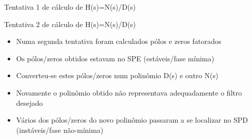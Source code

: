 \begin{frame}{Tentativa 1 de cálculo de H(s)=N(s)/D(s)}
        \begin{figure}[!htb]
        \centering
    \end{figure}
\end{frame}

\begin{frame}{Tentativa 2 de cálculo de H(s)=N(s)/D(s)}
    \begin{itemize}
        \item Numa segunda tentativa foram calculados pólos e zeros fatorados
        \item Os pólos/zeros obtidos estavam no SPE (estáveis/fase mínima)
        \item Converteu-se estes pólos/zeros num polinômio D(s) e outro N(s)
        \item Novamente o polinômio obtido não representava adequadamente o filtro desejado
        \item Vários dos pólos/zeros do novo polinômio passaram a se localizar no SPD (instáveis/fase não-mínima)
    \end{itemize}
\end{frame}

